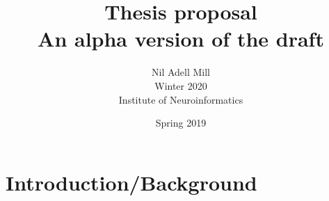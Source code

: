 \documentclass{article}
\begin{document}
\title{\Large Thesis proposal \\ \small An alpha version of the draft}
\author{Nil Adell Mill \\
        Winter 2020 \\
        Institute of Neuroinformatics \\}
\date{Spring 2019}

\maketitle

    \section*{Introduction/Background}
    
    
\end{document}
